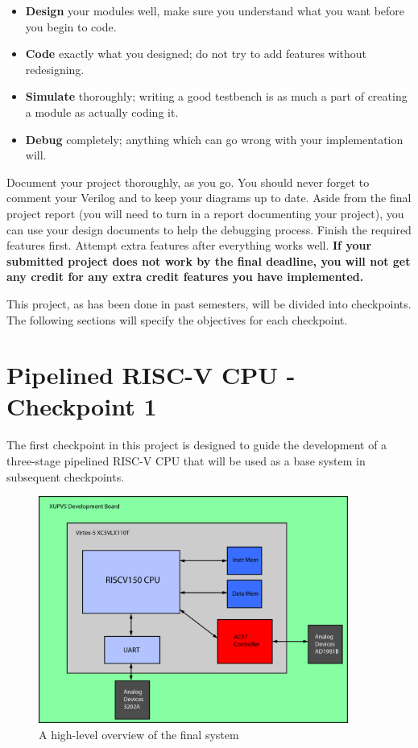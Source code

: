 \documentclass[11pt]{article}
\begin{document}
\begin{itemize}
	\item \textbf{Design} your modules well, make sure you understand what you want before you begin to code.
	\item \textbf{Code} exactly what you designed; do not try to add features without redesigning.
	\item \textbf{Simulate} thoroughly; writing a good testbench is as much a part of creating a module as actually coding it.
	\item \textbf{Debug} completely; anything which can go wrong with your implementation will.
\end{itemize}

Document your project thoroughly, as you go. You should never forget to comment your Verilog and to keep your diagrams up to date.  Aside from the final project report (you will need to turn in a report documenting your project), you can use your design documents to help the debugging process.  Finish the required features first.  Attempt extra features after everything works well. \textbf{If your submitted project does not work by the final deadline, you will not get any credit for any extra credit features you have implemented.}

This project, as has been done in past semesters, will be divided into checkpoints. The following sections will specify the objectives for each checkpoint.

\section{Pipelined RISC-V CPU - Checkpoint 1}
The first checkpoint in this project is designed to guide the development of a three-stage pipelined RISC-V CPU that will be used as a base system in subsequent checkpoints.

\begin{figure}[hbt]
\begin{center}
	\includegraphics[width=4in]{ProjectBlockDiagramLarge}
	\caption{A high-level overview of the final system}
	\label{fig:sys_overview}
\end{center}
\end{figure}
\end{document}
